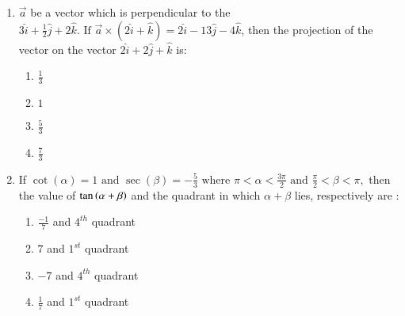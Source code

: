 \documentclass[journal]{IEEEtran}
\theoremstyle{remark}
\begin{document}
\begin{enumerate}[start=16]
\item   
 $\vec{a}$ be a vector which is perpendicular to the  $3\hat{i} + \frac{1}{2}\hat{j} + 2\hat{k}.  \text{ If }  \vec{a} \times (2\hat{i} + \hat{k}) = 2\hat{i} - 13\hat{j} - 4\hat{k}$, then the projection of the vector on the vector
$2\hat{i} + 2\hat{j} + \hat{k} $ is: 

\begin{multicols}{4}
\begin{enumerate}
\item $\frac{1}{3}$
\item $1$
\item $\frac{5}{3}$
\item $\frac{7}{3}$
\end{enumerate}
\end{multicols}

\item  If
$\cot(\alpha) = 1   \text{ and }   \sec(\beta) = -\frac{5}{3} \text{ where }   \pi < \alpha < \frac{3\pi}{2}   \text{ and }   \frac{\pi}{2} < \beta < \pi,$ then the value of $\tan \left(\alpha + \beta\right)$ and the quadrant in which $\alpha + \beta$ lies, respectively are :

\begin{multicols}{2}
\begin{enumerate}
\item $\frac{-1}{7} $ and $4^{th}$ quadrant
\item $7 $ and $1^{st}$ quadrant
\item $-7$ and $4^{th}$ quadrant
\item $\frac{1}{7} $ and $1^{st}$ quadrant
\end{enumerate}
\end{multicols}

\end{enumerate}
\end{document}
